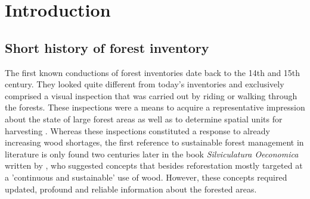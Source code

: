 	

	

	
\chapter{Introduction}
\label{chap:intro}
\newpage
\section{Short history of forest inventory}
\label{sec:intro:hist_soa}

The first known conductions of forest inventories date back to the 14th and 15th century. They looked quite different from today's inventories and exclusively comprised a visual inspection that was carried out by riding or walking through the forests. These inspections were a means to acquire a representative impression about the state of large forest areas as well as to determine spatial units for harvesting \citep{zoehrer1980}. Whereas these inspections constituted a response to already increasing wood shortages, the first reference to sustainable forest management in literature is only found two centuries later in the book \textit{Silviculatura Oeconomica} written by \citet{carlowitz1713}, who suggested concepts that besides reforestation mostly targeted at a 'continuous and sustainable' use of wood. However, these concepts required updated, profound and reliable information about the forested areas.\par

